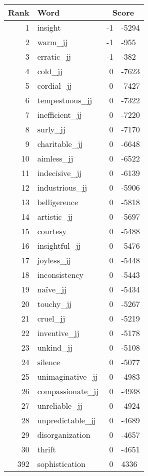 \begin{longtable}[!htbp]{| rlr@{.}l |}
    \hline
    \textbf{Rank} & \textbf{Word} & \multicolumn{2}{c|}{\textbf{Score}} \\
    \hline
    \endhead
    1 & insight & -1 & -5294 \\
    2 & warm\_jj & -1 & -955 \\
    3 & erratic\_jj & -1 & -382 \\
    4 & cold\_jj & 0 & -7623 \\
    5 & cordial\_jj & 0 & -7427 \\
    6 & tempestuous\_jj & 0 & -7322 \\
    7 & inefficient\_jj & 0 & -7220 \\
    8 & surly\_jj & 0 & -7170 \\
    9 & charitable\_jj & 0 & -6648 \\
    10 & aimless\_jj & 0 & -6522 \\
    11 & indecisive\_jj & 0 & -6139 \\
    12 & industrious\_jj & 0 & -5906 \\
    13 & belligerence & 0 & -5818 \\
    14 & artistic\_jj & 0 & -5697 \\
    15 & courtesy & 0 & -5488 \\
    16 & insightful\_jj & 0 & -5476 \\
    17 & joyless\_jj & 0 & -5448 \\
    18 & inconsistency & 0 & -5443 \\
    19 & naïve\_jj & 0 & -5434 \\
    20 & touchy\_jj & 0 & -5267 \\
    21 & cruel\_jj & 0 & -5219 \\
    22 & inventive\_jj & 0 & -5178 \\
    23 & unkind\_jj & 0 & -5108 \\
    24 & silence & 0 & -5077 \\
    25 & unimaginative\_jj & 0 & -4983 \\
    26 & compassionate\_jj & 0 & -4938 \\
    27 & unreliable\_jj & 0 & -4924 \\
    28 & unpredictable\_jj & 0 & -4689 \\
    29 & disorganization & 0 & -4657 \\
    30 & thrift & 0 & -4651 \\
    392 & sophistication & 0 & 4336 \\

\end{longtable}
